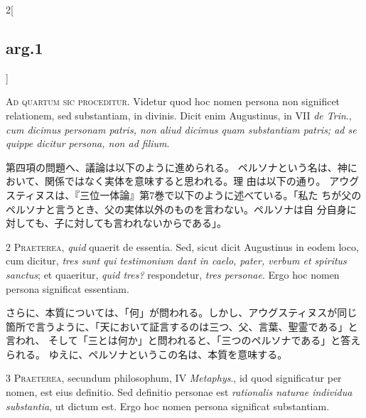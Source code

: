 \documentclass[paper=a4paper,fontsize=10pt,jafontsize=9pt,titlepage]{jlreq}
\begin{document}
\begin{paracol}{2}[\subsection{arg.1}]

{\Huge A}{\scshape d quartum sic proceditur}. Videtur quod hoc nomen persona non significet
relationem, sed substantiam, in divinis. Dicit enim Augustinus, in VII
{\itshape de Trin}., {\itshape cum dicimus personam patris, non aliud dicimus quam
substantiam patris; ad se quippe dicitur persona, non ad filium}.

\switchcolumn

第四項の問題へ、議論は以下のように進められる。
ペルソナという名は、神において、関係ではなく実体を意味すると思われる。理
 由は以下の通り。
アウグスティヌスは、『三位一体論』第7巻で以下のように述べている。「私た
 ちが父のペルソナと言うとき、父の実体以外のものを言わない。ペルソナは自
 分自身に対しても、子に対しても言われないからである」。


2 {\scshape Praeterea}, {\itshape quid} quaerit de essentia. Sed, sicut dicit Augustinus in
eodem loco, cum dicitur, {\itshape tres sunt qui testimonium dant in caelo, pater,
verbum et spiritus sanctus}; et quaeritur, {\itshape quid tres?} respondetur, {\itshape tres
personae}. Ergo hoc nomen persona significat essentiam.

\switchcolumn

さらに、本質については、「何」が問われる。しかし、アウグスティヌスが同じ
 箇所で言うように、「天において証言するのは三つ、父、言葉、聖霊である」と言われ、
 そして「三とは何か」と問われると、「三つのペルソナである」と答えられる。
 ゆえに、ペルソナというこの名は、本質を意味する。


3 {\scshape Praeterea}, secundum philosophum, IV {\itshape Metaphys}., id quod significatur per
nomen, est eius definitio. Sed definitio personae est {\itshape rationalis naturae
individua substantia}, ut dictum est. Ergo hoc nomen persona significat
substantiam.

\switchcolumn


\end{paracol}
\end{document}
